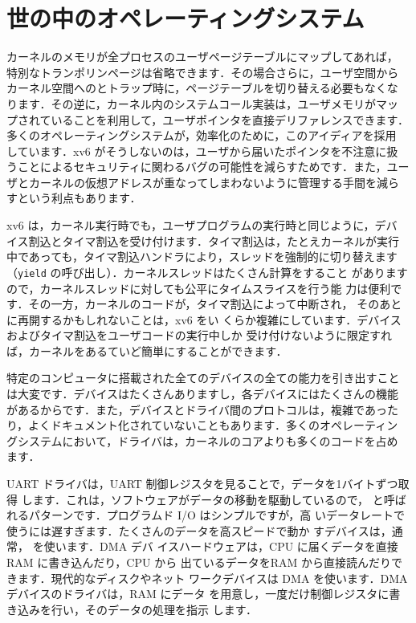 \section{世の中のオペレーティングシステム}

カーネルのメモリが全プロセスのユーザページテーブルにマップしてあれば，
特別なトランポリンページは省略できます．その場合さらに，ユーザ空間から
カーネル空間へのとトラップ時に，ページテーブルを切り替える必要もなくな
ります．その逆に，カーネル内のシステムコール実装は，ユーザメモリがマッ
プされていることを利用して，ユーザポインタを直接デリファレンスできます．
多くのオペレーティングシステムが，効率化のために，このアイディアを採用
しています．xv6 がそうしないのは，ユーザから届いたポインタを不注意に扱
うことによるセキュリティに関わるバグの可能性を減らすためです．また，ユー
ザとカーネルの仮想アドレスが重なってしまわないように管理する手間を減ら
すという利点もあります．

xv6 は，カーネル実行時でも，ユーザプログラムの実行時と同じように，デバ
イス割込とタイマ割込を受け付けます．タイマ割込は，たとえカーネルが実行
中であっても，タイマ割込ハンドラにより，スレッドを強制的に切り替えます
（\texttt{yield} の呼び出し）．カーネルスレッドはたくさん計算をすること
がありますので，カーネルスレッドに対しても公平にタイムスライスを行う能
力は便利です．その一方，カーネルのコードが，タイマ割込によって中断され，
そのあとに再開するかもしれないことは，xv6 をい
くらか複雑にしています．デバイスおよびタイマ割込をユーザコードの実行中しか
受け付けないように限定すれば，カーネルをあるていど簡単にすることができます．

特定のコンピュータに搭載された全てのデバイスの全ての能力を引き出すこと
は大変です．デバイスはたくさんありますし，各デバイスにはたくさんの機能
があるからです．また，デバイスとドライバ間のプロトコルは，複雑であった
り，よくドキュメント化されていないこともあります．多くのオペレーティン
グシステムにおいて，ドライバは，カーネルのコアよりも多くのコードを占め
ます．

UART ドライバは，UART 制御レジスタを見ることで，データを1バイトずつ取得
します．これは，ソフトウェアがデータの移動を駆動しているので，
 と呼ばれるパターンです．プログラムド I/O はシンプルですが，高
いデータレートで使うには遅すぎます．たくさんのデータを高スピードで動か
すデバイスは，通常， を使います．DMA デバ
イスハードウェアは，CPU に届くデータを直接 RAM に書き込んだり，CPU から
出ているデータをRAM から直接読んだりできます．現代的なディスクやネット
ワークデバイスは DMA を使います．DMA デバイスのドライバは，RAM にデータ
を用意し，一度だけ制御レジスタに書き込みを行い，そのデータの処理を指示
します．

